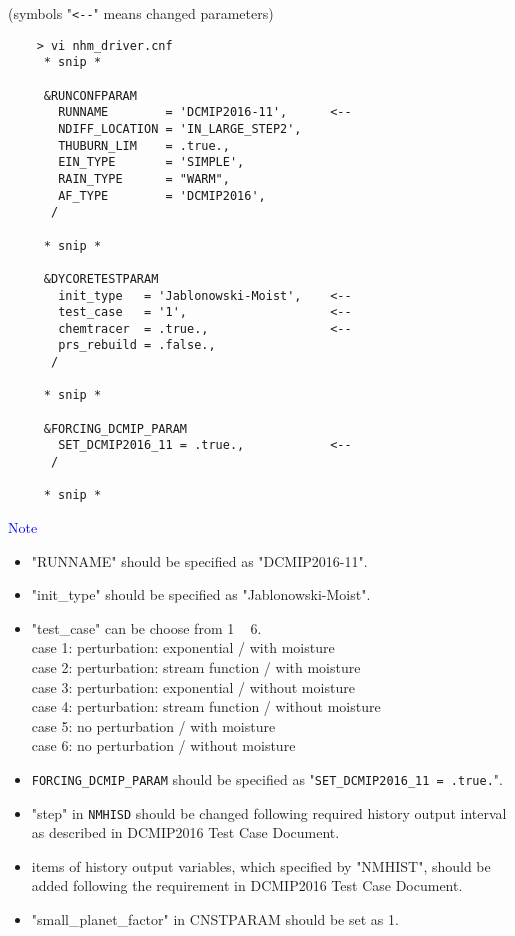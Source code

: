 \documentclass[a4paper]{article}
\begin{document}
 \vspace{0.5cm}

 (symbols "\verb|<--|" means changed parameters)
 \begin{verbatim}
    > vi nhm_driver.cnf
     * snip *

     &RUNCONFPARAM
       RUNNAME        = 'DCMIP2016-11',      <--
       NDIFF_LOCATION = 'IN_LARGE_STEP2',
       THUBURN_LIM    = .true.,
       EIN_TYPE       = 'SIMPLE',
       RAIN_TYPE      = "WARM",
       AF_TYPE        = 'DCMIP2016',
      /

     * snip *

     &DYCORETESTPARAM
       init_type   = 'Jablonowski-Moist',    <--
       test_case   = '1',                    <--
       chemtracer  = .true.,                 <--
       prs_rebuild = .false.,
      /

     * snip *

     &FORCING_DCMIP_PARAM
       SET_DCMIP2016_11 = .true.,            <--
      /

     * snip *
 \end{verbatim}

 
 \noindent \textcolor{blue}{{\sf Note}}
 \begin{itemize}
   \item "RUNNAME" should be specified as "DCMIP2016-11".
   \item "init\_type" should be specified as "Jablonowski-Moist".
   \item "test\_case" can be choose from 1 ~ 6.\\
          case 1: perturbation: exponential / with moisture \\
          case 2: perturbation: stream function / with moisture \\
          case 3: perturbation: exponential / without moisture \\
          case 4: perturbation: stream function / without moisture \\
          case 5: no perturbation / with moisture \\
          case 6: no perturbation / without moisture
   \item \verb|FORCING_DCMIP_PARAM| should be specified as "\verb|SET_DCMIP2016_11 = .true.|".
   \item "step" in \verb|NMHISD| should be changed following required history output interval
           as described in DCMIP2016 Test Case Document.
   \item items of history output variables, which specified by "NMHIST", should be added
         following the requirement in DCMIP2016 Test Case Document.
   \item "small\_planet\_factor" in CNSTPARAM should be set as 1.
 \end{itemize}
\end{document}
